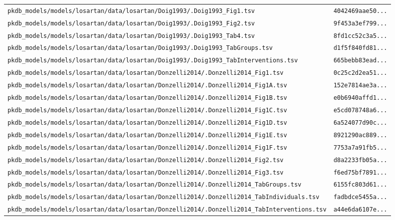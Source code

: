 \documentclass{article}
\begin{document}
\begin{longtable}{ll}
\texttt{pkdb\_models/models/losartan/data/losartan/Doig1993/.Doig1993\_Fig1.tsv} & \texttt{4042469aae50...} \\
\texttt{pkdb\_models/models/losartan/data/losartan/Doig1993/.Doig1993\_Fig2.tsv} & \texttt{9f453a3ef799...} \\
\texttt{pkdb\_models/models/losartan/data/losartan/Doig1993/.Doig1993\_Tab4.tsv} & \texttt{8fd1cc52c3a5...} \\
\texttt{pkdb\_models/models/losartan/data/losartan/Doig1993/.Doig1993\_TabGroups.tsv} & \texttt{d1f5f840fd81...} \\
\texttt{pkdb\_models/models/losartan/data/losartan/Doig1993/.Doig1993\_TabInterventions.tsv} & \texttt{665bebb83ead...} \\
\texttt{pkdb\_models/models/losartan/data/losartan/Donzelli2014/.Donzelli2014\_Fig1.tsv} & \texttt{0c25c2d2ea51...} \\
\texttt{pkdb\_models/models/losartan/data/losartan/Donzelli2014/.Donzelli2014\_Fig1A.tsv} & \texttt{152e7814ae3a...} \\
\texttt{pkdb\_models/models/losartan/data/losartan/Donzelli2014/.Donzelli2014\_Fig1B.tsv} & \texttt{e0b6940affd1...} \\
\texttt{pkdb\_models/models/losartan/data/losartan/Donzelli2014/.Donzelli2014\_Fig1C.tsv} & \texttt{e5cd078748a6...} \\
\texttt{pkdb\_models/models/losartan/data/losartan/Donzelli2014/.Donzelli2014\_Fig1D.tsv} & \texttt{6a524077d90c...} \\
\texttt{pkdb\_models/models/losartan/data/losartan/Donzelli2014/.Donzelli2014\_Fig1E.tsv} & \texttt{8921290ac889...} \\
\texttt{pkdb\_models/models/losartan/data/losartan/Donzelli2014/.Donzelli2014\_Fig1F.tsv} & \texttt{7753a7a91fb5...} \\
\texttt{pkdb\_models/models/losartan/data/losartan/Donzelli2014/.Donzelli2014\_Fig2.tsv} & \texttt{d8a2233fb05a...} \\
\texttt{pkdb\_models/models/losartan/data/losartan/Donzelli2014/.Donzelli2014\_Fig3.tsv} & \texttt{f6ed75bf7891...} \\
\texttt{pkdb\_models/models/losartan/data/losartan/Donzelli2014/.Donzelli2014\_TabGroups.tsv} & \texttt{6155fc803d61...} \\
\texttt{pkdb\_models/models/losartan/data/losartan/Donzelli2014/.Donzelli2014\_TabIndividuals.tsv} & \texttt{fadbdce5455a...} \\
\texttt{pkdb\_models/models/losartan/data/losartan/Donzelli2014/.Donzelli2014\_TabInterventions.tsv} & \texttt{a44e6da6107e...} \\

\end{longtable}
\end{document}
